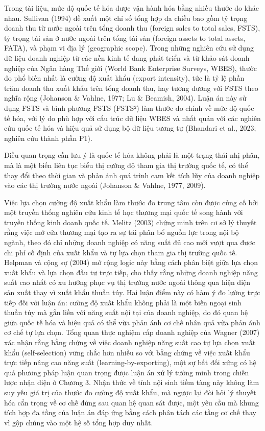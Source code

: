 \documentclass[
  a4paper,
  13pt]{extreport}
\begin{document}
Trong tài liệu, mức độ quốc tế hóa được vận hành hóa bằng nhiều thước đo
khác nhau. Sullivan (1994) đề xuất một chỉ số tổng hợp đa chiều bao gồm
tỷ trọng doanh thu từ nước ngoài trên tổng doanh thu (foreign sales to
total sales, FSTS), tỷ trọng tài sản ở nước ngoài trên tổng tài sản
(foreign assets to total assets, FATA), và phạm vi địa lý (geographic
scope). Trong những nghiên cứu sử dụng dữ liệu doanh nghiệp từ các nền
kinh tế đang phát triển và từ khảo sát doanh nghiệp của Ngân hàng Thế
giới (World Bank Enterprise Surveys, WBES), thước đo phổ biến nhất là
cường độ xuất khẩu (export intensity), tức là tỷ lệ phần trăm doanh thu
xuất khẩu trên tổng doanh thu, hay tương đương với FSTS theo nghĩa rộng
(Johanson \& Vahlne, 1977; Lu \& Beamish, 2004). Luận án này sử dụng
FSTS và bình phương FSTS (FSTS²) làm thước đo chính về mức độ quốc tế
hóa, với lý do phù hợp với cấu trúc dữ liệu WBES và nhất quán với các
nghiên cứu quốc tế hóa và hiệu quả sử dụng bộ dữ liệu tương tự (Bhandari
et al., 2023; nghiên cứu thành phần P1).

Điều quan trọng cần lưu ý là quốc tế hóa không phải là một trạng thái
nhị phân, mà là một biến liên tục biểu thị cường độ tham gia thị trường
quốc tế, có thể thay đổi theo thời gian và phản ánh quá trình cam kết
tích lũy của doanh nghiệp vào các thị trường nước ngoài (Johanson \&
Vahlne, 1977, 2009).

Việc lựa chọn cường độ xuất khẩu làm thước đo trung tâm còn được củng cố
bởi một truyền thống nghiên cứu kinh tế học thương mại quốc tế song hành
với truyền thống kinh doanh quốc tế. Melitz (2003) chứng minh trên cơ sở
lý thuyết rằng việc mở cửa thương mại tạo ra sự tái phân bổ nguồn lực
trong nội bộ ngành, theo đó chỉ những doanh nghiệp có năng suất đủ cao
mới vượt qua được chi phí cố định của xuất khẩu và tự lựa chọn tham gia
thị trường quốc tế. Helpman và cộng sự (2004) mở rộng logic này bằng
cách phân biệt giữa lựa chọn xuất khẩu và lựa chọn đầu tư trực tiếp, cho
thấy rằng những doanh nghiệp năng suất cao nhất có xu hướng phục vụ thị
trường nước ngoài thông qua hiện diện sản xuất thay vì xuất khẩu thuần
túy. Hai luận điểm này có hàm ý đo lường trực tiếp đối với luận án:
cường độ xuất khẩu không phải là một biến ngoại sinh thuần túy mà gắn
liền với năng suất nội tại của doanh nghiệp, do đó quan hệ giữa quốc tế
hóa và hiệu quả có thể vừa phản ánh cơ chế nhân quả vừa phản ánh cơ chế
tự lựa chọn. Tổng quan thực nghiệm cấp doanh nghiệp của Wagner (2007)
xác nhận rằng bằng chứng về việc doanh nghiệp năng suất cao tự lựa chọn
xuất khẩu (self-selection) vững chắc hơn nhiều so với bằng chứng về việc
xuất khẩu trực tiếp nâng cao năng suất (learning-by-exporting), một sự
bất đối xứng có hệ quả phương pháp luận quan trọng được luận án xử lý
tường minh trong chiến lược nhận diện ở Chương 3. Nhận thức về tính nội
sinh tiềm tàng này không làm suy yếu giá trị của thước đo cường độ xuất
khẩu, mà ngược lại đòi hỏi lý thuyết hóa cẩn trọng về cơ chế đứng sau
quan hệ quan sát được, một yêu cầu mà khung tích hợp đa tầng của luận án
đáp ứng bằng cách phân tách các tầng cơ chế thay vì gộp chúng vào một hệ
số tổng hợp duy nhất.
\end{document}
